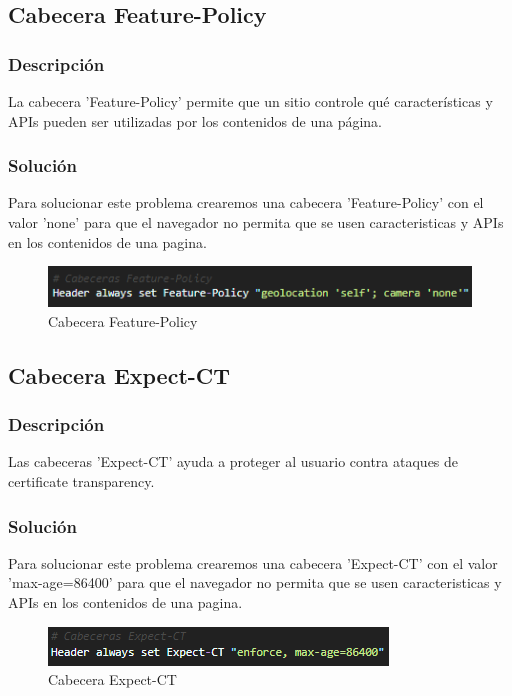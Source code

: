 \documentclass{report}
\begin{document}
            \subsection{Cabecera Feature-Policy}
                \subsubsection{Descripción}
                    La cabecera 'Feature-Policy' permite que un sitio controle qué características y APIs pueden ser utilizadas por los contenidos de una página.
                \subsubsection{Solución}
                    Para solucionar este problema crearemos una cabecera 'Feature-Policy' con el valor 'none' para que el navegador no permita que se usen caracteristicas y APIs en los contenidos de una pagina.
                    \begin{figure}[H]
                        \centering
                        \includegraphics[width=\textwidth]{./img/vulnerabilidades/3.5/12.1.png}
                        \caption{Cabecera Feature-Policy}
                    \end{figure}
            \clearpage
            \subsection{Cabecera Expect-CT}
                \subsubsection{Descripción}
                    Las cabeceras 'Expect-CT' ayuda a proteger al usuario contra ataques de certificate transparency.
                \subsubsection{Solución}
                    Para solucionar este problema crearemos una cabecera 'Expect-CT' con el valor 'max-age=86400' para que el navegador no permita que se usen caracteristicas y APIs en los contenidos de una pagina.
                    \begin{figure}[H]
                        \centering
                        \includegraphics[width=\textwidth]{./img/vulnerabilidades/3.5/13.1.png}
                        \caption{Cabecera Expect-CT}
                    \end{figure}
            \clearpage
\end{document}
